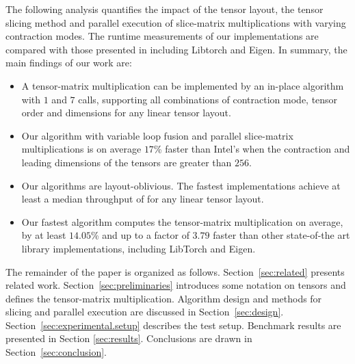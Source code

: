 The following analysis quantifies the impact of the tensor layout, the tensor slicing method and parallel execution of slice-matrix multiplications with varying contraction modes.
The runtime measurements of our implementations are compared with those presented in \cite{springer:2018:design, matthews:2018:high} including Libtorch and Eigen.
In summary, the main findings of our work are:
\begin{itemize}
	\item 
	A tensor-matrix multiplication can be implemented by an in-place algorithm with $1$  and $7$  calls, supporting all combinations of contraction mode, tensor order and dimensions for any linear tensor layout.
	\item 
	Our algorithm with variable loop fusion and parallel slice-matrix multiplications is on average $17$\% faster than Intel's  when the contraction and leading dimensions of the tensors are greater than $256$.
	\item 
	Our algorithms are layout-oblivious.
	The fastest implementations achieve at least a median throughput of \tq for any linear tensor layout.
	\item
	Our fastest algorithm computes the tensor-matrix multiplication on average, by at least $14.05$\% and up to a factor of $3.79$ faster than other state-of-the art library implementations, including LibTorch and Eigen.
\end{itemize}

The remainder of the paper is organized as follows. 
Section~\ref{sec:related} presents related work.
Section~\ref{sec:preliminaries} introduces some notation on tensors and defines the tensor-matrix multiplication.
Algorithm design and methods for slicing and parallel execution are discussed in Section~\ref{sec:design}.
Section~\ref{sec:experimental.setup} describes the test setup. Benchmark results are presented in Section \ref{sec:results}.
Conclusions are drawn in Section~\ref{sec:conclusion}.